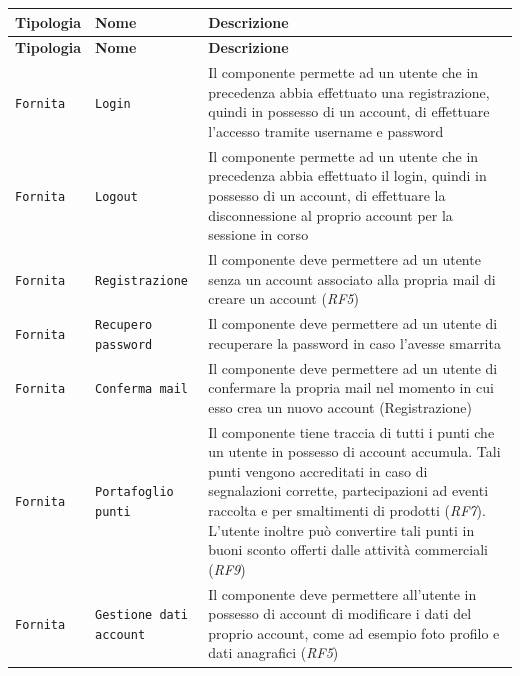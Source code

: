 \documentclass[12pt,a4paper]{article}
\begin{document}
\begin{tabularx}{\textwidth}{@{}llX@{}}
\caption{Tabelle descrizione componente per gestione utente}
\label{tab:placeholder} \\

\toprule
\textbf{Tipologia} & \textbf{Nome} & \textbf{Descrizione} \\
\midrule
\endfirsthead

\toprule
\textbf{Tipologia} & \textbf{Nome} & \textbf{Descrizione} \\
\midrule
\endhead

\bottomrule
\endfoot

\texttt{Fornita} & \texttt{Login} & Il componente permette ad un utente che in precedenza abbia effettuato una registrazione, quindi in possesso di un account, di effettuare l'accesso tramite username e password \\ \hline

\texttt{Fornita} & \texttt{Logout} & Il componente permette ad un utente che in precedenza abbia effettuato il login, quindi in possesso di un account, di effettuare la disconnessione al proprio account per la sessione in corso \\ \hline

\texttt{Fornita} & \texttt{Registrazione} & Il componente deve permettere ad un utente senza un account associato alla propria mail di creare un account (\textit{RF5}) \\ \hline

\texttt{Fornita} & \texttt{Recupero password} & Il componente deve permettere ad un utente di recuperare la password in caso l'avesse smarrita \\ \hline

\texttt{Fornita} & \texttt{Conferma mail} & Il componente deve permettere ad un utente di confermare la propria mail nel momento in cui esso crea un nuovo account (Registrazione) \\ \hline

\texttt{Fornita} & \texttt{Portafoglio punti} & Il componente tiene traccia di tutti i punti che un utente in possesso di account accumula. Tali punti vengono accreditati in caso di segnalazioni corrette, partecipazioni ad eventi raccolta e per smaltimenti di prodotti (\textit{RF7}). L'utente inoltre può convertire tali punti in buoni sconto offerti dalle attività commerciali (\textit{RF9}) \\ \hline

\texttt{Fornita} & \texttt{Gestione dati account} & Il componente deve permettere all'utente in possesso di account di modificare i dati del proprio account, come ad esempio foto profilo e dati anagrafici (\textit{RF5}) \\ \hline


\end{tabularx}
\end{document}
